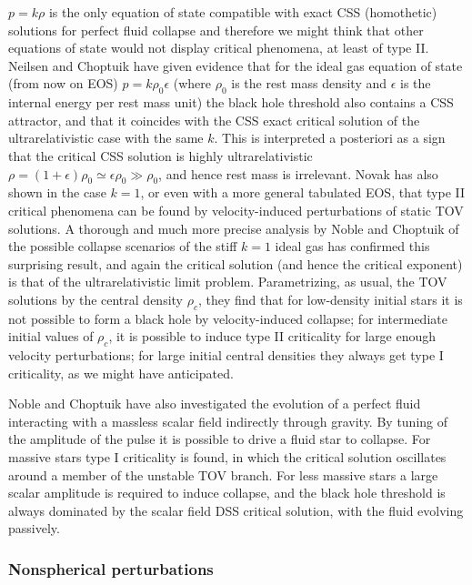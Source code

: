 \documentclass{article}
\begin{document}
$p=k\rho$ is the only equation of state compatible with exact CSS
(homothetic) solutions for perfect fluid collapse \cite{CahillTaub}
and therefore we might think that other equations of state would not
display critical phenomena, at least of type II. Neilsen and Choptuik
\cite{NeilsenChoptuik} have given evidence that for the ideal gas
equation of state (from now on EOS)
$p=k\rho_0\epsilon$ (where $\rho_0$ is the rest mass density and
$\epsilon$ is the internal energy per rest mass unit) the black
hole threshold also contains a CSS attractor, and that it coincides
with the CSS exact critical solution of the ultrarelativistic case
with the same $k$. This is interpreted a posteriori as a sign that the
critical CSS solution is highly ultrarelativistic
$\rho=(1+\epsilon)\rho_0 \simeq \epsilon\rho_0\gg \rho_0$, and hence
rest mass is irrelevant. Novak \cite{Novak} has also shown in the case
$k=1$, or even with a more general tabulated EOS, that type II
critical phenomena can be found by velocity-induced perturbations of
static TOV solutions. A thorough and much more precise analysis by
Noble and Choptuik \cite{Noble, NobleChoptuik} of the possible collapse
scenarios of
the stiff $k=1$ ideal gas has confirmed this surprising result, and
again the critical solution (and hence the critical exponent) is that
of the ultrarelativistic limit problem.  Parametrizing, as usual, the
TOV solutions by the central density $\rho_c$, they find that for
low-density initial stars it is not possible to form a black hole by
velocity-induced collapse; for intermediate initial values of
$\rho_c$, it is possible to induce type II criticality for large
enough velocity perturbations; for large initial central densities
they always get type I criticality, as we might have anticipated.

Noble and Choptuik \cite{Noble} have also investigated the evolution
of a perfect fluid interacting with a massless scalar field indirectly
through gravity. By tuning of the amplitude of the pulse it is
possible to drive a fluid star to collapse.  For massive stars type I
criticality is found, in which the critical solution oscillates around
a member of the unstable TOV branch. For less massive stars a large
scalar amplitude is required to induce collapse, and the black hole
threshold is always dominated by the scalar field DSS critical
solution, with the fluid evolving passively.

\subsubsection{Nonspherical perturbations}
\end{document}
